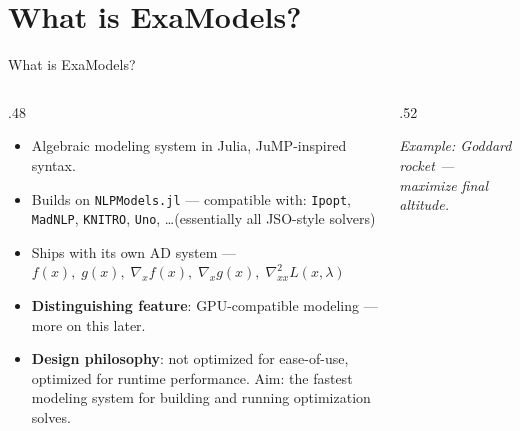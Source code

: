 \documentclass[aspectratio=169,11pt]{beamer}
\begin{document}
\section{What is ExaModels?}
\begin{frame}[fragile]{What is ExaModels?}
  \begin{columns}[T]
    \begin{column}{.48\textwidth}
      \begin{itemize}\itemsep4pt
      \item \alert{Algebraic modeling system} in Julia, JuMP-inspired syntax.
      \item<2-> Builds on \texttt{NLPModels.jl} --- compatible with: \texttt{Ipopt}, \texttt{MadNLP}, \texttt{KNITRO}, \texttt{Uno}, \dots (essentially all JSO-style solvers)
      \item<3-> Ships with its own AD system --- $f(x),\; g(x),\; \nabla_{x} f(x),\; \nabla_{x} g(x),\; \nabla^2_{xx} L(x,\lambda)$
      \item<4-> \alert{\bfseries Distinguishing feature}: \alert{GPU-compatible modeling} --- more on this later.
      \item<5-> \alert{\bfseries Design philosophy}: not optimized for ease-of-use, optimized for \alert{runtime performance}. Aim: the \alert{fastest modeling system} for building and running optimization solves.  
      \end{itemize}
    \end{column}
    \begin{column}{.52\textwidth}
      \vspace{-2.25em}
      {\scriptsize\itshape Example: Goddard rocket --- maximize final altitude.\par}
      \begin{codebox}\end{codebox}
    \end{column}
  \end{columns}
\end{frame}

\end{document}

